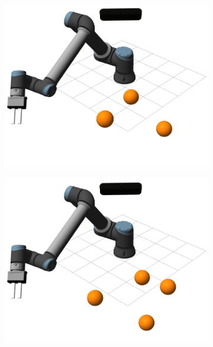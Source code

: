 \begin{figure}[h]
    \begin{subfigure}{.2\linewidth}
        \centering
        \includegraphics[width=.95\linewidth]{figs/chp6/obstacle_3.png}
    \end{subfigure}%
    \begin{subfigure}{.2\linewidth}
        \centering
        \includegraphics[width=.95\linewidth]{figs/chp6/obstacle_4.png}
    \end{subfigure}%
    \begin{subfigure}{.2\linewidth}
        \centering

\end{subfigure}
\end{figure}
